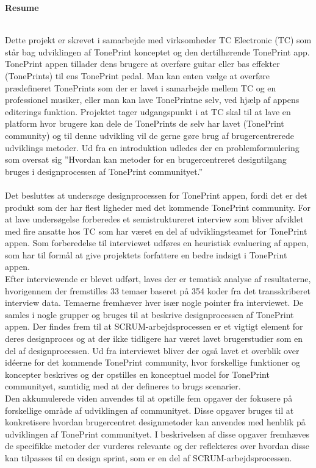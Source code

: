 \begin{LARGE}
\textbf{Resume}
\end{LARGE}
\\
\noindent
Dette projekt er skrevet i samarbejde med virksomheder TC Electronic (TC) som står bag udviklingen af TonePrint konceptet og den dertilhørende TonePrint app. TonePrint appen tillader dens brugere at overføre guitar eller bas effekter (TonePrints) til ens TonePrint pedal. Man kan enten vælge at overføre prædefineret TonePrints som der er lavet i samarbejde mellem TC og en professionel musiker, eller man kan lave TonePrintne selv, ved hjælp af appens editerings funktion. Projektet tager udgangspunkt i at TC skal til at lave en platform hvor brugere kan dele de TonePrints de selv har lavet (TonePrint community) og til denne udvikling vil de gerne gøre brug af brugercentrerede udviklings metoder. Ud fra en introduktion udledes der en problemformulering som oversat sig ”Hvordan kan metoder for en brugercentreret designtilgang bruges i designprocessen af TonePrint communityet.” \\
\\
Det besluttes at undersøge designprocessen for TonePrint appen, fordi det er det produkt som der har flest ligheder med det kommende TonePrint community. For at lave undersøgelse forberedes et semistruktureret interview som bliver afviklet med fire ansatte hos TC som har været en del af udviklingsteamet for TonePrint appen. Som forberedelse til interviewet udføres en heuristisk evaluering af appen, som har til formål at give projektets forfattere en bedre indsigt i TonePrint appen. \\
Efter interviewende er blevet udført, laves der er tematisk analyse af resultaterne, hvorigennem der fremstilles 33 temaer baseret på 354 koder fra det transskriberet interview data. Temaerne fremhæver hver især nogle pointer fra interviewet. De samles i nogle grupper og bruges til at beskrive designprocessen af TonePrint appen. Der findes frem til at SCRUM-arbejdsprocessen er et vigtigt element for deres designproces og at der ikke tidligere har været lavet brugerstudier som en del af designprocessen. Ud fra interviewet bliver der også lavet et overblik over idéerne for det kommende TonePrint community, hvor forskellige funktioner og koncepter beskrives og der opstilles en konceptuel model for TonePrint communityet, samtidig med at der defineres to brugs scenarier. \\
Den akkumulerede viden anvendes til at opstille fem opgaver der fokusere på forskellige område af udviklingen af communityet. Disse opgaver bruges til at konkretisere hvordan brugercentret designmetoder kan anvendes med henblik på udviklingen af TonePrint communityet. I beskrivelsen af disse opgaver fremhæves de specifikke metoder der vurderes relevante og der reflekteres over hvordan disse kan tilpasses til en design sprint, som er en del af SCRUM-arbejdsprocessen. \\
